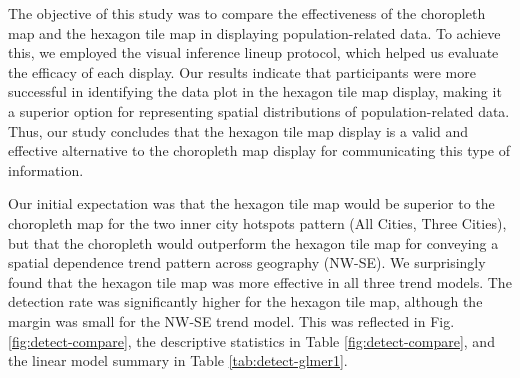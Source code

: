 \documentclass[journal]{vgtc}                     %
\begin{document}
The objective of this study was to compare the effectiveness of the choropleth map and the hexagon tile map in displaying population-related data. To achieve this, we employed the visual inference lineup protocol, which helped us evaluate the efficacy of each display. Our results indicate that participants were more successful in identifying the data plot in the hexagon tile map display, making it a superior option for representing spatial distributions of population-related data. Thus, our study concludes that the hexagon tile map display is a valid and effective alternative to the choropleth map display for communicating this type of information.


Our initial expectation was that the hexagon tile map would be superior to the choropleth map for the two inner city hotspots pattern (All Cities, Three Cities), but that the choropleth would outperform the hexagon tile map for conveying a spatial dependence trend pattern across geography (NW-SE). We surprisingly found that the hexagon tile map was more effective in all three trend models. The detection rate was significantly higher for the hexagon tile map, although the margin was small for the NW-SE trend model.  This was reflected in Fig. \ref{fig:detect-compare}, the descriptive statistics in Table \ref{fig:detect-compare}, and the linear model summary in Table \ref{tab:detect-glmer1}.
\end{document}

